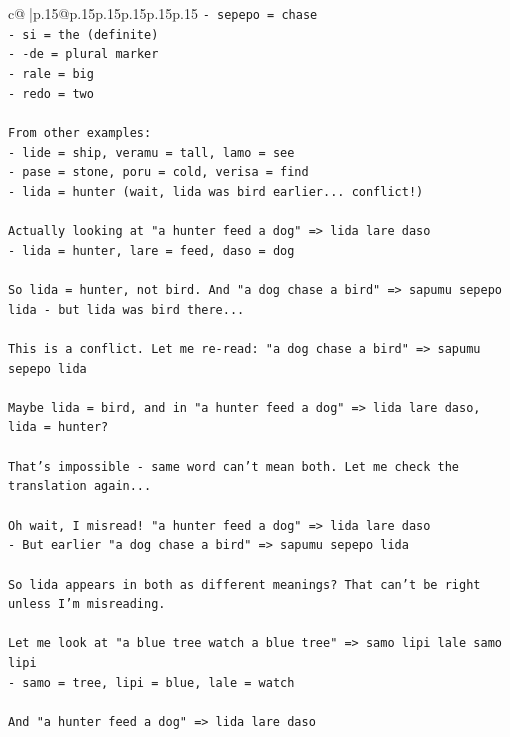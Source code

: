 \documentclass{article}
\begin{document}
{\begin{supertabular}{c@{$\;$}|p{.15\linewidth}@{}p{.15\linewidth}p{.15\linewidth}p{.15\linewidth}p{.15\linewidth}p{.15\linewidth}}
{{{\texttt{{-} sepepo = chase} \\
\texttt{{-} si = the (definite)} \\
\texttt{{-} {-}de = plural marker} \\
\texttt{{-} rale = big} \\
\texttt{{-} redo = two} \\
\\ 
\texttt{From other examples:} \\
\texttt{{-} lide = ship, veramu = tall, lamo = see} \\
\texttt{{-} pase = stone, poru = cold, verisa = find} \\
\texttt{{-} lida = hunter (wait, lida was bird earlier... conflict!)} \\
\\ 
\texttt{Actually looking at "a hunter feed a dog" => lida lare daso} \\
\texttt{{-} lida = hunter, lare = feed, daso = dog} \\
\\ 
\texttt{So lida = hunter, not bird. And "a dog chase a bird" => sapumu sepepo lida {-} but lida was bird there...} \\
\\ 
\texttt{This is a conflict. Let me re{-}read: "a dog chase a bird" => sapumu sepepo lida} \\
\\ 
\texttt{Maybe lida = bird, and in "a hunter feed a dog" => lida lare daso, lida = hunter?} \\
\\ 
\texttt{That's impossible {-} same word can't mean both. Let me check the translation again...} \\
\\ 
\texttt{Oh wait, I misread! "a hunter feed a dog" => lida lare daso} \\
\texttt{{-} But earlier "a dog chase a bird" => sapumu sepepo lida} \\
\\ 
\texttt{So lida appears in both as different meanings? That can't be right unless I'm misreading.} \\
\\ 
\texttt{Let me look at "a blue tree watch a blue tree" => samo lipi lale samo lipi} \\
\texttt{{-} samo = tree, lipi = blue, lale = watch} \\
\\ 
\texttt{And "a hunter feed a dog" => lida lare daso} \\
}}}
\end{supertabular}}
\end{document}
